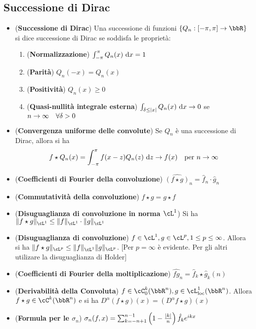 \documentclass[a4paper,NoNotes,GeneralMath]{stdmdoc}
\newcommand{\intpie}{\int_{-\pi}^\pi }
\begin{document}
        \subsection*{Successione di Dirac}
        \begin{itemize}
        \item ({\bf Successione di Dirac}) Una successione di funzioni $\{ Q_n: [-\pi, \pi] \rar \bbR \}$ si dice successione di Dirac se soddisfa le proprietà:
          \begin{enumerate}
          \item ({\bf Normalizzazione}) $\intpie Q_n(x) \de x = 1$
          \item ({\bf Parità}) $Q_n(-x) = Q_n(x)$
          \item ({\bf Positività}) $Q_n(x) \ge 0$
          \item ({\bf Quasi-nullità integrale esterna}) $\int_{\delta \le \abs{x}} Q_n(x) \de x \rar 0$ se $n \rightarrow \infty \quad \forall \delta > 0$
          \end{enumerate}
        \item ({\bf Convergenza uniforme delle convolute}) Se $Q_n$ è una successione di Dirac, allora si ha $$ f \star Q_n (x) = \intpie f(x - z)Q_n(z) \de z \rar f(x) \quad \text{per } n \rar \infty $$
        \item ({\bf Coefficienti di Fourier della convoluzione}) $ \hat{(f \star g)}_n = \hat{f}_n \cdot \hat{g}_n $
        \item ({\bf Commutatività della convoluzione}) $f \star g = g \star f$
        \item ({\bf Disuguaglianza di convoluzione in norma $\cL^1$}) Si ha $\norm{f \star g}_{\cL^1} \le \norm{f}_{\cL^1} \cdot \norm{g}_{\cL^1}$
        \item ({\bf Disuguaglianza di convoluzione}) $f \in \cL^1, g \in \cL^p, 1 \le p \le \infty$. Allora si ha $\norm{f \star g}_{\cL^p} \le \norm{f}_{\cL^1} \norm{g}_{\cL^p}$. [Per $p = \infty$ è evidente. Per gli altri utilizare la disuguaglianza di Holder]
        \item ({\bf Coefficienti di Fourier della moltiplicazione}) $\hat{fg}_n = \hat{f}_k \star \hat{g}_k (n)$
        \item ({\bf Derivabilità della Convoluta}) $f \in \cC_0^k(\bbR^n), g \in \cL^1_{\text{loc}}(\bbR^n)$. Allora $f \star g \in \cC^k(\bbR^n)$ e si ha $D^\alpha (f \star g) (x) = (D^\alpha f \star g) (x)$
        \item ({\bf Formula per le $\sigma_n$}) $\sigma_n(f, x) = \sum_{k = -n+1}^{n-1} \left( 1 - \frac{\mid k \mid}{n} \right) \hat{f}_k e^{ikx}$

\end{itemize}
\end{document}
